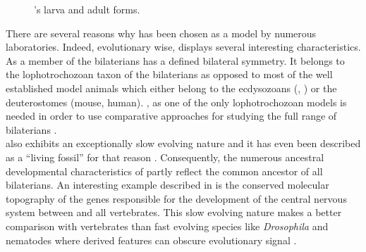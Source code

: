      
\begin{figure}[bth]
        \myfloatalign
         \quad
        \caption{\platyfull{}'s larva and adult forms.}\label{fig:platynereis}
\end{figure}
     
     There are several reasons why \platy{} has been chosen as a model by numerous laboratories. Indeed, evolutionary wise, \platy{} displays several interesting characteristics.  As a member of the bilaterians \platy{} has a defined bilateral symmetry. It belongs to the lophotrochozoan taxon of the bilaterians as opposed to most of the well established model animals which either belong to the ecdysozoans (, ) or the deuterostomes (mouse, human). \platy{}, as one of the only lophotrochozoan models is needed in order to use comparative approaches for studying the full range of bilaterians \citep{Fischer10}.\\
     
     \platy{} also exhibits an exceptionally slow evolving nature and it has even been described as a ``living fossil'' for that reason \citep{Fischer10}. Consequently, the numerous ancestral developmental characteristics of \platy{} partly reflect the common ancestor of all bilaterians. An interesting example described in \citep{denes07,tessmar07} is the conserved molecular topography of the genes responsible for the development of the central nervous system between \platy{} and all vertebrates. This slow evolving nature makes \platy{} a better comparison with vertebrates than fast evolving species like \emph{Drosophila} and nematodes where derived features can obscure evolutionary signal \citep{Fischer10,arendt124}.\\
     
